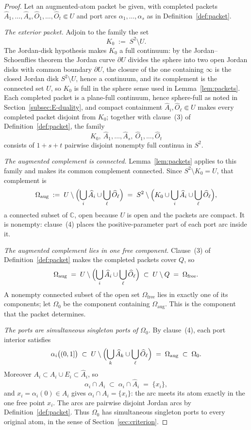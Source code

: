 \documentclass[11pt,reqno]{amsart}
\theoremstyle{definition}
\theoremstyle{remark}
\newcommand{\C}{\mathbb C}
\newcommand{\Omfree}{\Omega_{\mathrm{free}}}
\begin{document}
\begin{proof}
Let an augmented-atom packet be given, with completed packets
$\widehat A_1,\dots,\widehat A_s,\widehat O_1,\dots,\widehat O_t\Subset U$ and port
arcs $\alpha_1,\dots,\alpha_s$ as in Definition~\ref{def:packet}.

\emph{The exterior packet.}
Adjoin to the family the set
\[
K_0\;:=\;S^2\setminus U .
\]
The Jordan-disk hypothesis makes $K_0$ a full continuum: by the Jordan--Schoenflies
theorem the Jordan curve $\partial U$ divides the sphere into two open Jordan disks
with common boundary $\partial U$, the closure of the one containing $\infty$ is the
closed Jordan disk $S^2\setminus U$, hence a continuum, and its complement is the
connected set $U$, so $K_0$ is full in the sphere sense used in
Lemma~\ref{lem:packets}. Each completed packet is a plane-full continuum, hence
sphere-full as noted in Section~\ref{subsec:E-duality}, and compact containment
$\widehat A_i,\widehat O_\ell\Subset U$ makes every completed packet disjoint from
$K_0$; together with clause~(3) of Definition~\ref{def:packet}, the family
\[
K_0,\ \widehat A_1,\dots,\widehat A_s,\ \widehat O_1,\dots,\widehat O_t
\]
consists of $1+s+t$ pairwise disjoint nonempty full continua in $S^2$.

\emph{The augmented complement is connected.}
Lemma~\ref{lem:packets} applies to this family and makes its common complement
connected. Since $S^2\setminus K_0=U$, that complement is
\begin{equation}\label{eq:E-omega-aug}
\Omega_{\mathrm{aug}}\;:=\;
U\setminus\Bigl(\bigcup_{i}\widehat A_i\cup\bigcup_{\ell}\widehat O_\ell\Bigr)
\;=\;S^2\setminus\Bigl(K_0\cup\bigcup_i\widehat A_i\cup
\bigcup_\ell\widehat O_\ell\Bigr),
\end{equation}
a connected subset of $\C$, open because $U$ is open and the packets are compact. It
is nonempty: clause~(4) places the positive-parameter part of each port arc inside
it.

\emph{The augmented complement lies in one free component.}
Clause~(3) of Definition~\ref{def:packet} makes the completed packets cover $Q$, so
\[
\Omega_{\mathrm{aug}}
\;=\;U\setminus\Bigl(\bigcup_i\widehat A_i\cup\bigcup_\ell\widehat O_\ell\Bigr)
\;\subset\;U\setminus Q\;=\;\Omfree .
\]
A nonempty connected subset of the open set $\Omfree$ lies in exactly one of its
components; let $\Omega_0$ be the component containing $\Omega_{\mathrm{aug}}$. This
is the component that the packet determines.

\emph{The ports are simultaneous singleton ports of $\Omega_0$.}
By clause~(4), each port interior satisfies
\[
\alpha_i\bigl((0,1]\bigr)\;\subset\;
U\setminus\Bigl(\bigcup_k\widehat A_k\cup\bigcup_\ell\widehat O_\ell\Bigr)
\;=\;\Omega_{\mathrm{aug}}\;\subset\;\Omega_0 .
\]
Moreover $A_i\subset A_i\cup E_i\subset\widehat A_i$, so
\[
\alpha_i\cap A_i\;\subset\;\alpha_i\cap\widehat A_i\;=\;\{x_i\},
\]
and $x_i=\alpha_i(0)\in A_i$ gives $\alpha_i\cap A_i=\{x_i\}$: the arc meets its atom
exactly in the one free point $x_i$. The arcs are pairwise disjoint Jordan arcs by
Definition~\ref{def:packet}. Thus $\Omega_0$ has simultaneous singleton ports to
every original atom, in the sense of Section~\ref{sec:criterion}.


\end{proof}
\end{document}
